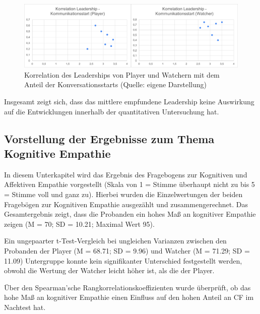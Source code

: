 \begin{figure}[ht]
\centering
\includegraphics[width=1\linewidth]{content/pictures/Korrelation_Leaderhip_Start_of_conversation.png}
\caption{Korrelation des Leaderships von Player und Watchern mit dem Anteil der Konversationsstarts (Quelle: eigene Darstellung)}
\label{fig:correlation_leadership_conversation_starts}
\end{figure}

Insgesamt zeigt sich, dass das mittlere empfundene Leadership keine Auswirkung auf die Entwicklungen innerhalb der quantitativen Untersuchung hat.

\subsection{Vorstellung der Ergebnisse zum Thema Kognitive Empathie}
In diesem Unterkapitel wird das Ergebnis des Fragebogens zur Kognitiven und Affektiven Empathie vorgestellt (Skala von 1 = Stimme überhaupt nicht zu bis 5 = Stimme voll und ganz zu). Hierbei wurden die Einzelwertungen der beiden Fragebögen zur Kognitiven Empathie ausgezählt und zusammengerechnet. Das Gesamtergebnis zeigt, dass die Probanden ein hohes Maß an kognitiver Empathie zeigen (M = 70; SD = 10.21; Maximal Wert 95). 

Ein ungepaarter t-Test-Vergleich bei ungleichen Varianzen zwischen den Probanden der Player (M = 68.71; SD = 9.96) und Watcher (M = 71.29; SD = 11.09) Untergruppe konnte kein signifikanter Unterschied festgestellt werden, obwohl die Wertung der Watcher leicht höher ist, als die der Player. 

Über den Spearman'sche Rangkorrelationskoeffizienten wurde überprüft, ob das hohe Maß an kognitiver Empathie einen Einfluss auf den hohen Anteil an \ac{CF} im Nachtest hat. 

